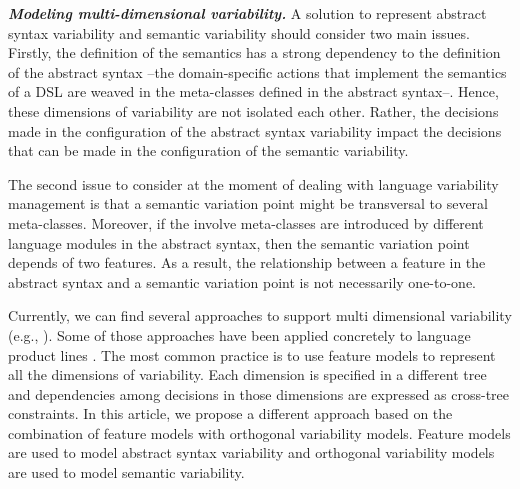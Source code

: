 
\vspace{2mm}
\textbf{\textit{Modeling multi-dimensional variability.}} A solution to represent abstract syntax variability and semantic variability should consider two main issues. Firstly, the definition of the semantics has a strong dependency to the definition of the abstract syntax --the domain-specific actions that implement the semantics of a DSL are weaved in the meta-classes defined in the abstract syntax--. Hence, these dimensions of variability are not isolated each other. Rather, the decisions made in the configuration of the abstract syntax variability impact the decisions that can be made in the configuration of the semantic variability. 

The second issue to consider at the moment of dealing with language variability management is that a semantic variation point might be transversal to several meta-classes. Moreover, if the involve meta-classes are introduced by different language modules in the abstract syntax, then the semantic variation point depends of two features. As a result, the relationship between a feature in the abstract syntax and a semantic variation point is not necessarily one-to-one. 


Currently, we can find several approaches to support multi dimensional variability (e.g., \cite{Rosenmuller:2011}). Some of those approaches have been applied concretely to language product lines \cite{Liebig:2013}. The most common practice is to use feature models to represent all the dimensions of variability. Each dimension is specified in a different tree and dependencies among decisions in those dimensions are expressed as cross-tree constraints. In this article, we propose a different approach based on the combination of feature models with orthogonal variability models. Feature models are used to model abstract syntax variability and orthogonal variability models are used to model semantic variability.

